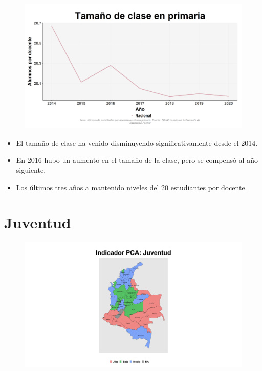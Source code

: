     \begin{figure}[H]
        \caption[Tamaño de clase en primaria a nivel nacional ]{\label{tamano_primaria_nal_trend} }
        \begin{center}
        \includegraphics[width=\textwidth,keepaspectratio]{img/var_229_trend.png}
        \end{center}
    \end{figure}
            \begin{itemize}
                \item El tamaño de clase ha venido disminuyendo significativamente desde el 2014.
                \item En 2016 hubo un aumento en el tamaño de la clase, pero se compensó al año siguiente.
                \item Los últimos tres años a mantenido niveles del 20 estudiantes por docente.
                \end{itemize}

\section{Juventud}

\begin{figure}[H]
        \caption[Indicador Pulso Social sobre Juventud]{\label{pca_juvented} }
        \begin{center}
        \includegraphics[width=\textwidth,keepaspectratio]{pca_clusters/pca_juventud_pca.png}
        \end{center}
    \end{figure}
    
